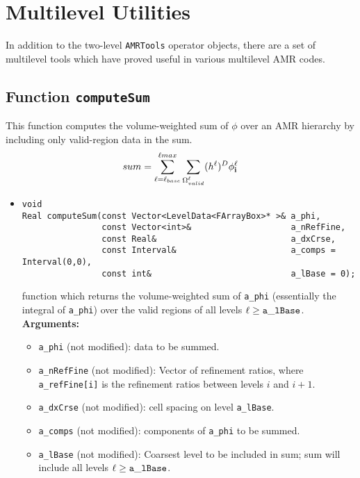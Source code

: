 \section{Multilevel Utilities}

In addition to the two-level {\tt AMRTools} operator objects, there
are a set of multilevel tools which have proved useful in various
multilevel AMR codes.

\subsection{Function {\tt computeSum}}

This function computes the volume-weighted sum of $\phi$ over an AMR
hierarchy by including only valid-region data in the sum. 
\begin{equation}
sum = \sum_{\ell=\ell_{base}}^{\ell{max}} \sum_{\Omega^\ell_{valid}}
(h^\ell)^D \phi^\ell_{\bf{i}}
\end{equation}

\begin{itemize}

\item
\begin{verbatim}
void
Real computeSum(const Vector<LevelData<FArrayBox>* >& a_phi,
                const Vector<int>&                    a_nRefFine,
                const Real&                           a_dxCrse,
                const Interval&                       a_comps = Interval(0,0),
                const int&                            a_lBase = 0);
\end{verbatim}
function which returns the volume-weighted sum of \verb/a_phi/
(essentially the integral of \verb/a_phi/) over
the valid regions of all levels $\ell \geq \tt{a\_lBase}$.
\\ {\bf Arguments:}
  \begin{itemize}
  \item
  \verb|a_phi| (not modified): data to be summed.
  \item
  \verb|a_nRefFine| (not modified): Vector of refinement ratios, where
  \verb/a_refFine[i]/ is the refinement ratios between levels $i$ and
  $i+1$. 
  \item
  \verb|a_dxCrse| (not modified): cell spacing on level \verb/a_lBase/.
  \item
  \verb|a_comps| (not modified): components of \verb/a_phi/ to be
  summed.
  \item
  \verb|a_lBase| (not modified): Coarsest level to be included in sum;
  sum will include all levels $\ell \geq \tt{a\_lBase}$. 

  \end{itemize}

\end{itemize}



